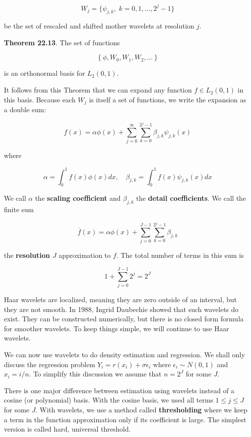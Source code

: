 \[ W_{j} = \{\psi_{j, k}, \; k = 0, 1, \dots, 2^{j} - 1\} \]

be the set of rescaled and shifted mother wavelets at resolution \(j\).

\textbf{Theorem 22.13}. The set of functions

\[ \left\{ \phi, W_{0}, W_{1}, W_{2}, \dots \right\} \]

is an orthonormal basis for \(L_{2}(0, 1)\).

It follows from this Theorem that we can expand any function
\(f \in L_{2}(0, 1)\) in this basis. Because each \(W_{j}\) is itself a set
of functions, we write the expansion as a double sum:

\[ f(x) = \alpha \phi(x) + \sum_{j=0}^{\infty} \sum_{k=0}^{2^{j} - 1} \beta_{j, k} \psi_{j, k}(x) \]

where

\[ \alpha = \int_{0}^{1} f(x) \phi(x) dx, \quad \beta_{j, k} = \int_{0}^{1} f(x) \psi_{j, k}(x) dx\]

We call \(\alpha\) the \textbf{scaling coefficient} and \(\beta_{j, k}\)
the \textbf{detail coefficients}. We call the finite sum

\[ \overline{f}(x) = \alpha \phi(x) + \sum_{j=0}^{J - 1} \sum_{k=0}^{2^{j} - 1} \beta_{j, k}\]

the \textbf{resolution \(J\)} approximation to \(f\). The total number
of terms in this sum is

\[ 1 + \sum_{j=0}^{J - 1}2^{j} = 2^J\]

Haar wavelets are localized, meaning they are zero outside of an
interval, but they are not smooth. In 1988, Ingrid Daubechie showed that
such wavelets do exist. They can be constructed numerically, but there
is no closed form formula for smoother wavelets. To keep things simple,
we will continue to use Haar wavelets.

We can now use wavelets to do density estimation and regression. We
shall only discuss the regression problem
\(Y_{i} = r(x_{i}) + \sigma \epsilon_{i}\) where \(\epsilon_{i} \sim N(0, 1)\)
and \(x_{i} = i / n\). To simplify this discussion we assume that
\(n = 2^J\) for some \(J\).

There is one major difference between estimation using wavelets instead
of a cosine (or polynomial) basis. With the cosine basis, we used all
terms \(1 \leq j \leq J\) for some \(J\). With wavelets, we use a method
called \textbf{thresholding} where we keep a term in the function
approximation only if its coefficient is large. The simplest version is
called hard, universal threshold.

